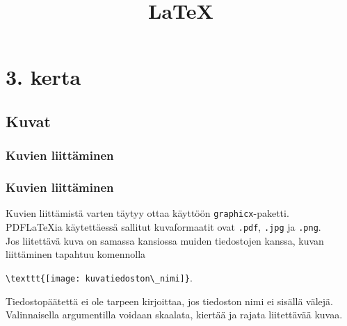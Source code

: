 \documentclass[handout,hyperref={colorlinks=true}]{beamer}
\title{\LaTeX}
\theoremstyle{remark}
\newcommand{\vaihto}{\\ \vspace{10pt}}
\begin{document}
\setcounter{section}{2}
\begin{frame}
    \titlepage
\end{frame}
\begin{frame}
    \tableofcontents
\end{frame}
\section{3. kerta}
\subsection{Kuvat}
\subsubsection{Kuvien liittäminen}
\begin{frame}[fragile]
    \frametitle{Kuvien liittäminen}
    Kuvien liittämistä varten täytyy ottaa käyttöön \verb-graphicx--paketti. 
    \vaihto
    PDFLaTeXia käytettäessä sallitut kuvaformaatit ovat \verb-.pdf-, \verb-.jpg- ja \verb-.png-. 
    \vaihto
    Jos liitettävä kuva on samassa kansiossa muiden tiedostojen kanssa, kuvan liittäminen tapahtuu komennolla
    \begin{framed}
        \centering
        \verb-\texttt{[image: kuvatiedoston\_nimi]}-. 
    \end{framed}
    Tiedostopäätettä ei ole tarpeen kirjoittaa, jos tiedoston nimi ei sisällä välejä.
    \vaihto
    Valinnaisella argumentilla voidaan skaalata, kiertää ja rajata liitettävää kuvaa. 
\end{frame}
\end{document}
